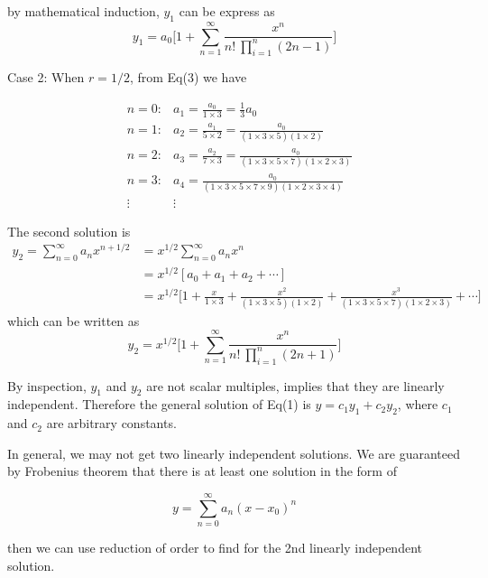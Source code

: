 \begin{solution}
    by mathematical induction, $y_1$ can be express as 
    \[
        y_1 = a_0 \biggl[1 + \sum_{n=1}^{\infty} \frac{x^n}{n! \> \prod_{i=1}^{n} (2n-1) }\biggr]
    \]


    Case 2: When $r = 1/2$, from Eq(3) we have

    \begin{align*}
        &n = 0: &a_1 = \frac{a_0}{1 \times 3} = \frac{1}{3}a_0\\
        &n = 1: &a_2 = \frac{a_1}{5 \times 2} = \frac{a_0}{(1 \times 3 \times 5)(1 \times 2)}\\
        &n = 2: &a_3 = \frac{a_2}{7 \times 3} = \frac{a_0}{(1 \times 3 \times 5 \times 7)(1\times 2 \times 3)}\\
        &n = 3: &a_4 
        = \frac{a_0}{(1 \times 3 \times 5 \times 7 \times 9)(1 \times 2 \times 3 \times 4)}\\
        &\vdots &\vdots 
    \end{align*}

    The second solution is 
    \begin{align*}
        y_2 = \sum^\infty_{n=0} a_n x^{n+1/2} &= x^{1/2} \sum^\infty_{n=0} a_n x^n\\
        &= x^{1/2} [a_0 + a_1 + a_2 + \cdots]\\
        &= x^{1/2} \biggl[1 + \frac{x}{1 \times 3} + \frac{x^2}{(1\times 3 \times 5)(1 \times 2) 
        } + \frac{x^3}{(1 \times 3 \times 5 \times 7) (1 \times 2 \times 3)} + \cdots\biggr]
    \end{align*}
    which can be written as 
    \[
        y_2 = x^{1/2} \biggl[1 + \sum_{n=1}^{\infty} \frac{x^n}{n! \> \prod_{i=1}^{n} (2n+1) }\biggr]
    \]

    By inspection, $y_1$ and $y_2$ are not scalar multiples, implies that they are linearly independent.
    Therefore the general solution of Eq(1) is $y = c_1y_1 + c_2y_2$, where $c_1$ and $c_2$ are 
    arbitrary constants.
\end{solution}

\begin{remark}
    In general, we may not get two linearly independent solutions. We are guaranteed by 
    Frobenius theorem that there is at least one solution in the form of 

    \begin{equation}
        y = \sum_{n=0}^{\infty} a_n (x-x_0)^n
    \end{equation}

    then we can use reduction of order to find for the 2nd linearly independent solution.
\end{remark}

